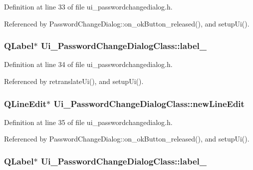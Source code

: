 Definition at line 33 of file ui\_\-passwordchangedialog.h.

Referenced by PasswordChangeDialog::on\_\-okButton\_\-released(), and setupUi().\hypertarget{class_ui___password_change_dialog_class_8410473d9dcbb97d5336fdd3988c51a3}{
\subsubsection[label\_\-2]{\setlength{\rightskip}{0pt plus 5cm}QLabel$\ast$ {\bf Ui\_\-PasswordChangeDialogClass::label\_}}}
\label{class_ui___password_change_dialog_class_8410473d9dcbb97d5336fdd3988c51a3}




Definition at line 34 of file ui\_\-passwordchangedialog.h.

Referenced by retranslateUi(), and setupUi().\hypertarget{class_ui___password_change_dialog_class_55f7bf56874085aeedb237ba5817b604}{
\subsubsection[newLineEdit]{\setlength{\rightskip}{0pt plus 5cm}QLineEdit$\ast$ {\bf Ui\_\-PasswordChangeDialogClass::newLineEdit}}}
\label{class_ui___password_change_dialog_class_55f7bf56874085aeedb237ba5817b604}




Definition at line 35 of file ui\_\-passwordchangedialog.h.

Referenced by PasswordChangeDialog::on\_\-okButton\_\-released(), and setupUi().\hypertarget{class_ui___password_change_dialog_class_083fbd918362f9d06d4909f8448d6695}{
\subsubsection[label\_\-3]{\setlength{\rightskip}{0pt plus 5cm}QLabel$\ast$ {\bf Ui\_\-PasswordChangeDialogClass::label\_}}}
\label{class_ui___password_change_dialog_class_083fbd918362f9d06d4909f8448d6695}




